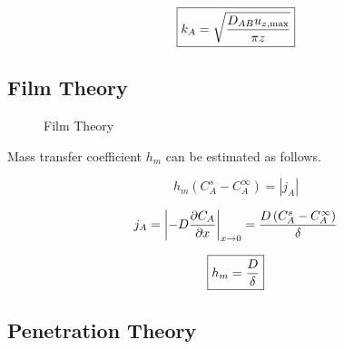 $$ \boxed{
k_A = \sqrt{D_{AB} u_{z,\text{max}} \over \pi z} 
}$$

\subsection{Film Theory}

\begin{figure}[h]
\begin{center}
\end{center}
\caption{Film Theory}
\label{filmtheory}
\end{figure}

Mass transfer coefficient $h_m$ can be estimated as follows.

$$ h_m \left( C_A^s - C_A^\infty \right) = \left| j_A \right| $$

$$ j_A = \left| -D {\partial C_A \over \partial x} \right|_{x \rightarrow 0} = {D \left( C_A^s - C_A^\infty \right) \over \delta} $$

\begin{equation}
\boxed{
	h_m = {D \over \delta}
}
\end{equation}

\subsection{Penetration Theory}

